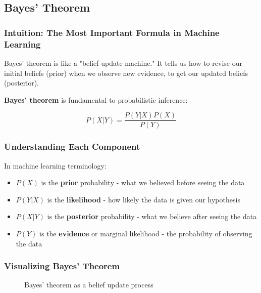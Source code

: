 \subsection{Bayes' Theorem}

\subsubsection{Intuition: The Most Important Formula in Machine Learning}

Bayes' theorem is like a "belief update machine." It tells us how to revise our initial beliefs (prior) when we observe new evidence, to get our updated beliefs (posterior).

\textbf{Bayes' theorem} is fundamental to probabilistic inference:

\begin{equation}
P(X|Y) = \frac{P(Y|X)P(X)}{P(Y)}
\end{equation}

\subsubsection{Understanding Each Component}

In machine learning terminology:
\begin{itemize}
    \item $P(X)$ is the \textbf{prior} probability - what we believed before seeing the data
    \item $P(Y|X)$ is the \textbf{likelihood} - how likely the data is given our hypothesis
    \item $P(X|Y)$ is the \textbf{posterior} probability - what we believe after seeing the data
    \item $P(Y)$ is the \textbf{evidence} or marginal likelihood - the probability of observing the data
\end{itemize}

\subsubsection{Visualizing Bayes' Theorem}

\begin{figure}[h]
\centering
{}
\caption{Bayes' theorem as a belief update process}
\label{fig:bayes-process}
\end{figure}

